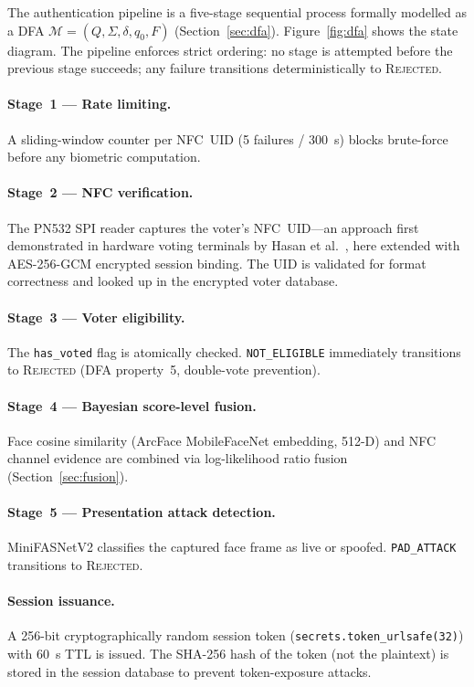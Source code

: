 \documentclass[preprint,12pt]{elsarticle}
\begin{document}
The authentication pipeline is a five-stage sequential process
formally modelled as a DFA $\mathcal{M} = (Q, \Sigma, \delta, q_0, F)$
(Section~\ref{sec:dfa}). Figure~\ref{fig:dfa} shows the state diagram.
The pipeline enforces strict ordering: no stage is attempted before the
previous stage succeeds; any failure transitions deterministically to
\textsc{Rejected}.

\paragraph{Stage~1 — Rate limiting.} A sliding-window counter per NFC~UID
(5 failures / 300~s) blocks brute-force before any biometric computation.

\paragraph{Stage~2 — NFC verification.} The PN532 SPI reader captures the
voter's NFC~UID—an approach first demonstrated in hardware voting terminals
by Hasan et al.~\cite{hasan2019nfc}, here extended with AES-256-GCM
encrypted session binding. The UID is validated for format correctness and
looked up in the encrypted voter database.

\paragraph{Stage~3 — Voter eligibility.} The \texttt{has\_voted} flag is
atomically checked. \texttt{NOT\_ELIGIBLE} immediately transitions to
\textsc{Rejected} (DFA property~5, double-vote prevention).

\paragraph{Stage~4 — Bayesian score-level fusion.} Face cosine similarity
(ArcFace MobileFaceNet embedding, 512-D) and NFC channel evidence are
combined via log-likelihood ratio fusion (Section~\ref{sec:fusion}).

\paragraph{Stage~5 — Presentation attack detection.} MiniFASNetV2 classifies
the captured face frame as live or spoofed. \texttt{PAD\_ATTACK} transitions
to \textsc{Rejected}.

\paragraph{Session issuance.} A 256-bit cryptographically random session
token (\texttt{secrets.token\_urlsafe(32)}) with 60~s TTL is issued.
The SHA-256 hash of the token (not the plaintext) is stored in the
session database to prevent token-exposure attacks.
\end{document}
